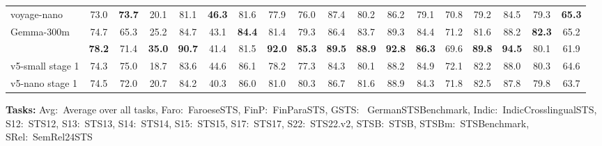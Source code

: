 \documentclass[11pt]{article}
\begin{document}
\begin{table}[H]
\begin{tabular}{@{}lccccccccccccccccc@{}}
voyage-nano & 73.0 & \textbf{73.7} & 20.1 & 81.1 & \textbf{46.3} & 81.6 & 77.9 & 76.0 & 87.4 & 80.2 & 86.2 & 79.1 & 70.8 & 79.2 & 84.5 & 79.3 & \textbf{65.3} \\
Gemma-300m & 74.7 & 65.3 & 25.2 & 84.7 & 43.1 & \textbf{84.4} & 81.4 & 79.3 & 86.4 & 83.7 & 89.3 & 84.4 & 71.2 & 81.6 & 88.2 & \textbf{82.3} & 65.2 \\
\textbf{\JEmbeddingVFiveTextNanoShort{}} & \textbf{78.2} & 71.4 & \textbf{35.0} & \textbf{90.7} & 41.4 & 81.5 & \textbf{92.0} & \textbf{85.3} & \textbf{89.5} & \textbf{88.9} & \textbf{92.8} & \textbf{86.3} & 69.6 & \textbf{89.8} & \textbf{94.5} & 80.1 & 61.9 \\
\midrule
v5-small stage 1 & 74.3 & 75.0 & 18.7 & 83.6 & 44.6 & 86.1 & 78.2 & 77.3 & 84.3 & 80.1 & 88.2 & 84.9 & 72.1 & 82.2 & 88.0 & 80.3 & 64.6 \\
v5-nano stage 1 & 74.5 & 72.0 & 20.7 & 84.2 & 40.3 & 86.0 & 81.0 & 80.3 & 86.7 & 81.6 & 88.9 & 84.3 & 71.8 & 82.5 & 87.8 & 79.8 & 63.7 \\
\bottomrule
\end{tabular}
\begin{flushleft}
\textbf{Tasks:} Avg:~Average over all tasks, Faro:~FaroeseSTS, FinP:~FinParaSTS, GSTS:~ GermanSTSBenchmark, Indic:~IndicCrosslingualSTS, S12:~STS12, S13:~STS13, S14:~STS14, S15:~STS15, S17:~STS17, S22:~STS22.v2, STSB:~STSB, STSBm:~STSBenchmark, SRel:~SemRel24STS
\end{flushleft}
\end{table}
\end{document}
